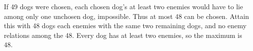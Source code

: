 If 49 dogs were chosen, each chosen dog's at least two enemies would have to lie among only one unchosen dog, impossible. Thus at most 48 can be chosen. Attain this with 48 dogs each enemies with the same two remaining dogs, and no enemy relations among the 48. Every dog has at least two enemies, so the maximum is $\boxed{48}$.
